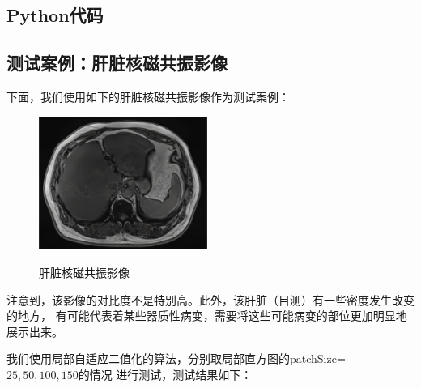 \documentclass{article}
\begin{document}
\subsection{Python代码}
 

\subsection{测试案例：肝脏核磁共振影像}
下面，我们使用如下的肝脏核磁共振影像作为测试案例：
\begin{figure}[H]
	\centering
	{\includegraphics[width=0.49\textwidth]{codes//肝脏.png}} 
	\caption{肝脏核磁共振影像}
\end{figure}
注意到，该影像的对比度不是特别高。此外，该肝脏（目测）有一些密度发生改变的地方，
有可能代表着某些器质性病变，需要将这些可能病变的部位更加明显地展示出来。

我们使用局部自适应二值化的算法，分别取局部直方图的patchSize=$25,50,100,150$的情况
进行测试，测试结果如下：
\end{document}
